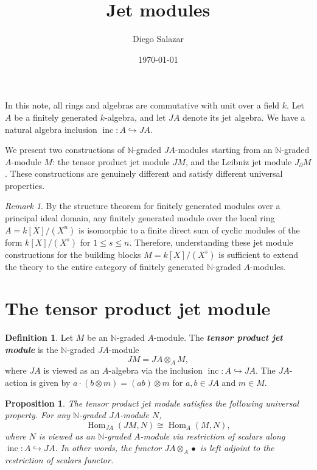 \documentclass[a4paper, 12pt]{amsart}
\newcommand{\defterm}[1]{\textbf{\textit{#1}}\index{#1}}
\newtheorem{proposition}[theorem]{Proposition}
\theoremstyle{definition}
\newtheorem{definition}[theorem]{Definition}
\theoremstyle{remark}
\newtheorem{remark}[theorem]{Remark}
\begin{document}
\title{Jet modules}
\author{Diego Salazar}
\date{\today}
\maketitle

In this note, all rings and algebras are commutative with unit over a field $k$.
Let $A$ be a finitely generated $k$-algebra, and let $JA$ denote its jet algebra.
We have a natural algebra inclusion $\operatorname{inc}: A \hookrightarrow JA$.

We present two constructions of $\mathbb{N}$-graded $JA$-modules starting from an $\mathbb{N}$-graded $A$-module $M$:
the tensor product jet module $JM$,
and the Leibniz jet module $J_\partial M$.
These constructions are genuinely different and satisfy different universal properties.

\begin{remark}
  \label{rmk:module-classification}
  By the structure theorem for finitely generated modules over a principal ideal domain, any finitely generated module over the local ring $A = k[X]/(X^n)$ is isomorphic to a finite direct sum of cyclic modules of the form $k[X]/(X^s)$ for $1 \le s \le n$. Therefore, understanding these jet module constructions for the building blocks $M = k[X]/(X^s)$ is sufficient to extend the theory to the entire category of finitely generated $\mathbb{N}$-graded $A$-modules.
\end{remark}

\section{The tensor product jet module}
\label{sec:tens-prod-jet}

\begin{definition}
  \label{def:JM}
  Let $M$ be an $\mathbb{N}$-graded $A$-module.
  The \defterm{tensor product jet module} is the $\mathbb{N}$-graded $JA$-module
  \begin{equation*}
    JM = JA \otimes_A M,
  \end{equation*}
  where $JA$ is viewed as an $A$-algebra via the inclusion $\operatorname{inc}: A \hookrightarrow JA$.
  The $JA$-action is given by $a \cdot (b \otimes m) = (ab) \otimes m$ for $a, b \in JA$ and $m \in M$.
\end{definition}

\begin{proposition}
  \label{prp:UP-JM}
  The tensor product jet module satisfies the following universal property.
  For any $\mathbb{N}$-graded $JA$-module $N$,
  \begin{equation}
    \label{eq:UP-JM}
    \operatorname{Hom}_{JA}(JM, N) \cong \operatorname{Hom}_A(M, N),
  \end{equation}
  where $N$ is viewed as an $\mathbb{N}$-graded $A$-module via restriction of scalars along $\operatorname{inc}: A \hookrightarrow JA$.
  In other words, the functor $JA \otimes_A \bullet$ is left adjoint to the restriction of scalars functor.
\end{proposition}
\end{document}

